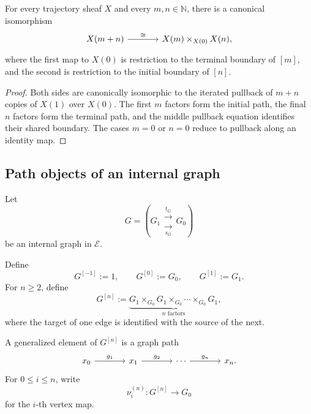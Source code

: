 \begin{corollary}
\label{cor:adjacent-temporal-gluing}
For every trajectory sheaf \(X\) and every \(m,n\in\mathbb N\), there is a
canonical isomorphism
\[
\begin{tikzcd}[column sep=large]
    X(m+n)
        \arrow[r, "\cong"]
    &
    X(m)\times_{X(0)}X(n),
\end{tikzcd}
\]
where the first map to \(X(0)\) is restriction to the terminal boundary of
\([m]\), and the second is restriction to the initial boundary of \([n]\).
\end{corollary}

\begin{proof}
Both sides are canonically isomorphic to the iterated pullback of \(m+n\)
copies of \(X(1)\) over \(X(0)\). The first \(m\) factors form the initial
path, the final \(n\) factors form the terminal path, and the middle pullback
equation identifies their shared boundary. The cases \(m=0\) or \(n=0\)
reduce to pullback along an identity map.
\end{proof}

\subsection{Path objects of an internal graph}
\label{subsec:path-objects-internal-graph}

Let
\[
    G=
    \left(
    G_1
    \mathrel{\substack{\xrightarrow{t_G}\\[-0.4em]\xrightarrow[s_G]{}}}
    G_0
    \right)
\]
be an internal graph in \(\mathcal E\).

\begin{definition}
\label{def:graph-path-objects}
Define
\[
    G^{[-1]}:=1,
    \qquad
    G^{[0]}:=G_0,
    \qquad
    G^{[1]}:=G_1.
\]
For \(n\geq2\), define
\[
    G^{[n]}
    :=
    \underbrace{
    G_1\times_{G_0}G_1
    \times_{G_0}\cdots
    \times_{G_0}G_1
    }_{n\text{ factors}},
\]
where the target of one edge is identified with the source of the next.
\end{definition}

A generalized element of \(G^{[n]}\) is a graph path
\[
\begin{tikzcd}[column sep=large]
    x_0
        \arrow[r, "g_1"]
    &
    x_1
        \arrow[r, "g_2"]
    &
    \cdots
        \arrow[r, "g_n"]
    &
    x_n.
\end{tikzcd}
\]
For \(0\leq i\leq n\), write
\[
    \nu_i^{(n)}:G^{[n]}\to G_0
\]
for the \(i\)-th vertex map.

